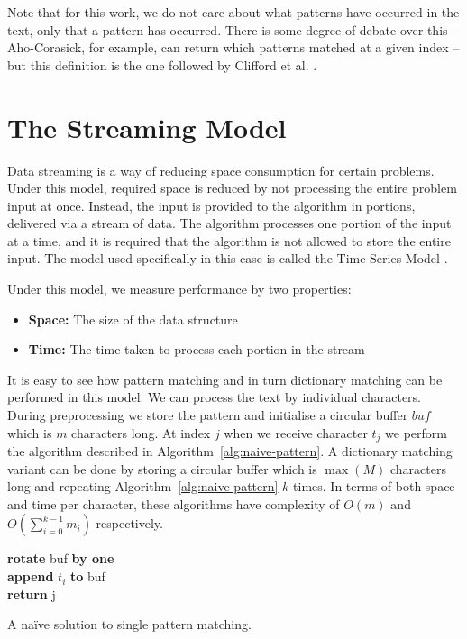 \documentclass[ %
                    author={Dominic Joseph Moylett},
                    degree={MEng},
                     title={Dictionary Matching with Fingerprints},
                  subtitle={An Empirical Analysis},
                      type={research},
                      year={2015} ]{dissertation}
\begin{document}
Note that for this work, we do not care about what patterns have occurred in the text, only that a pattern has occurred. There is some degree of debate over this -- Aho-Corasick, for example, can return which patterns matched at a given index -- but this definition is the one followed by Clifford et al. \cite{2015arXiv150406242C}.

\section{The Streaming Model}
\label{sec:streaming-model}

Data streaming \cite{TCS-002} is a way of reducing space consumption for certain problems. Under this model, required space is reduced by not processing the entire problem input at once. Instead, the input is provided to the algorithm in portions, delivered via a stream of data. The algorithm processes one portion of the input at a time, and it is required that the algorithm is not allowed to store the entire input. The model used specifically in this case is called the Time Series Model \cite{TCS-002}.

Under this model, we measure performance by two properties:
\begin{itemize}
  \item {\bf Space:} The size of the data structure
  \item {\bf Time:} The time taken to process each portion in the stream
\end{itemize}

It is easy to see how pattern matching and in turn dictionary matching can be performed in this model. We can process the text by individual characters. During preprocessing we store the pattern and initialise a circular buffer $buf$ which is $m$ characters long. At index $j$ when we receive character $t_j$ we perform the algorithm described in Algorithm~\ref{alg:naive-pattern}. A dictionary matching variant can be done by storing a circular buffer which is $\max(M)$ characters long and repeating Algorithm~\ref{alg:naive-pattern} $k$ times. In terms of both space and time per character, these algorithms have complexity of $O(m)$ and $O(\sum^{k-1}_{i=0}m_i)$ respectively.

\begin{algorithm}[t]
{\bf rotate} buf {\bf by one}\\
{\bf append} $t_i$ {\bf to} buf\\
{\bf return} j
\caption{A na\"{i}ve solution to single pattern matching.}
\label{alg:naive-pattern}
\end{algorithm}
\end{document}

